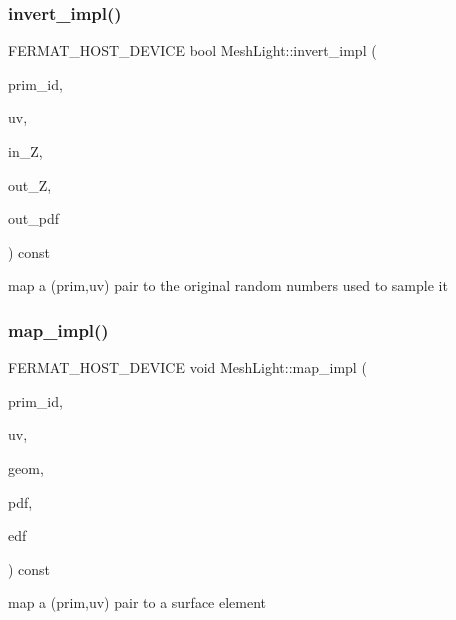 \subsubsection{\texorpdfstring{invert\+\_\+impl()}{invert\_impl()}}
{\footnotesize\ttfamily F\+E\+R\+M\+A\+T\+\_\+\+H\+O\+S\+T\+\_\+\+D\+E\+V\+I\+CE bool Mesh\+Light\+::invert\+\_\+impl (\begin{DoxyParamCaption}\item[{const uint32\+\_\+t}]{prim\+\_\+id,  }\item[{const \hyperlink{structcugar_1_1_vector}{cugar\+::\+Vector2f} \&}]{uv,  }\item[{const float $\ast$}]{in\+\_\+Z,  }\item[{float $\ast$}]{out\+\_\+Z,  }\item[{float $\ast$}]{out\+\_\+pdf }\end{DoxyParamCaption}) const\hspace{0.3cm}{\ttfamily [inline]}}

map a (prim,uv) pair to the original random numbers used to sample it \mbox{\label{struct_mesh_light_ad39eed77c5604446aef6dc7373ba80ce}} 
\subsubsection{\texorpdfstring{map\+\_\+impl()}{map\_impl()}\hspace{0.1cm}{\footnotesize\ttfamily [1/2]}}
{\footnotesize\ttfamily F\+E\+R\+M\+A\+T\+\_\+\+H\+O\+S\+T\+\_\+\+D\+E\+V\+I\+CE void Mesh\+Light\+::map\+\_\+impl (\begin{DoxyParamCaption}\item[{const uint32\+\_\+t}]{prim\+\_\+id,  }\item[{const \hyperlink{structcugar_1_1_vector}{cugar\+::\+Vector2f} \&}]{uv,  }\item[{\hyperlink{struct_vertex_geometry}{Vertex\+Geometry} $\ast$}]{geom,  }\item[{float $\ast$}]{pdf,  }\item[{\hyperlink{struct_edf}{Edf} $\ast$}]{edf }\end{DoxyParamCaption}) const\hspace{0.3cm}{\ttfamily [inline]}}

map a (prim,uv) pair to a surface element \mbox{\label{struct_mesh_light_a0be71bfb03b0489b514a3efcb2daf2a8}} 
